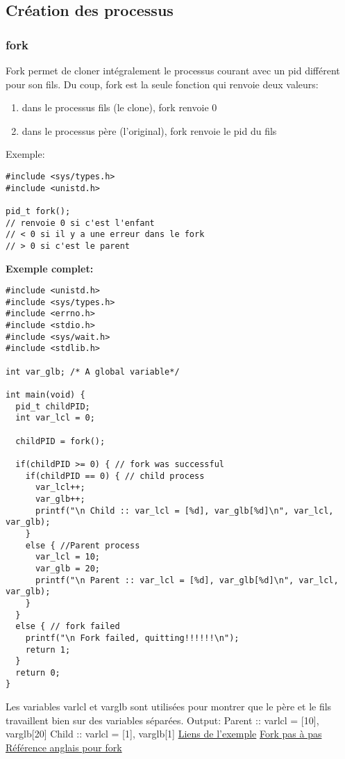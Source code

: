\documentclass[a4paper]{article}
\begin{document}
\subsection{Création des processus}
\subsubsection{fork}
Fork permet de cloner intégralement le processus courant avec un pid différent pour son fils.
Du coup, fork est la seule fonction qui renvoie deux valeurs:
\begin{enumerate}
  \item dans le processus fils (le clone), fork renvoie 0
  \item dans le processus père (l'original), fork renvoie le pid du fils
\end{enumerate}
Exemple:
\begin{lstlisting}
#include <sys/types.h>
#include <unistd.h>

pid_t fork();
// renvoie 0 si c'est l'enfant
// < 0 si il y a une erreur dans le fork
// > 0 si c'est le parent
\end{lstlisting}
\newpage
\textbf{Exemple complet:}
\begin{lstlisting}
#include <unistd.h>
#include <sys/types.h>
#include <errno.h>
#include <stdio.h>
#include <sys/wait.h>
#include <stdlib.h>

int var_glb; /* A global variable*/

int main(void) {
  pid_t childPID;
  int var_lcl = 0;

  childPID = fork();

  if(childPID >= 0) { // fork was successful
    if(childPID == 0) { // child process
      var_lcl++;
      var_glb++;
      printf("\n Child :: var_lcl = [%d], var_glb[%d]\n", var_lcl, var_glb);
    }
    else { //Parent process
      var_lcl = 10;
      var_glb = 20;
      printf("\n Parent :: var_lcl = [%d], var_glb[%d]\n", var_lcl, var_glb);
    }
  }
  else { // fork failed
    printf("\n Fork failed, quitting!!!!!!\n");
    return 1;
  }
  return 0;
}
\end{lstlisting}
Les variables var\textunderscore{}lcl et var\textunderscore{}glb sont utilisées pour montrer que le père et le fils travaillent bien sur des variables séparées.\newline
Output:\newline
Parent :: var\textunderscore{}lcl = [10], var\textunderscore{}glb[20]\newline
Child :: var\textunderscore{}lcl = [1], var\textunderscore{}glb[1]\newline
\href{https://www.thegeekstuff.com/2012/05/c-fork-function/}{Liens de l'exemple}\newline
\href{http://www.commentcamarche.net/faq/10611-que-fait-un-fork}{Fork pas à pas}\newline
\href{http://pubs.opengroup.org/onlinepubs/9699919799/functions/fork.html#}{Référence anglais pour fork}\newline
\end{document}
